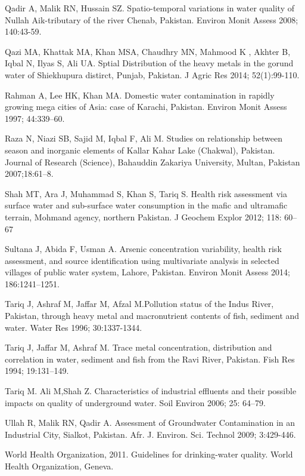\begin{thebibliography}
\bibitem{} \hangindent=1cm Qadir A, Malik RN, Hussain SZ. Spatio-temporal variations in water quality of Nullah Aik-tributary of the river Chenab, Pakistan. Environ Monit Assess 2008; 140:43-59.

\bibitem{} \hangindent=1cm Qazi MA, Khattak MA, Khan MSA, Chaudhry MN, Mahmood K , Akhter B, Iqbal N, Ilyas S, Ali UA. Sptial Distribution of the heavy metals in the gorund water of Shiekhupura distirct, Punjab, Pakistan. J Agric Res 2014; 52(1):99-110.

\bibitem{} \hangindent=1cm Rahman A, Lee HK, Khan MA. Domestic water contamination in rapidly growing mega cities of Asia: case of Karachi, Pakistan. Environ Monit Assess 1997; 44:339–60.

\bibitem{} \hangindent=1cm Raza N, Niazi SB, Sajid M, Iqbal F, Ali M. Studies on relationship between season and inorganic elements of Kallar Kahar Lake (Chakwal), Pakistan. Journal of Research (Science), Bahauddin Zakariya University, Multan, Pakistan 2007;18:61–8.

\bibitem{} \hangindent=1cm Shah MT, Ara J, Muhammad S, Khan S, Tariq S. Health risk assessment via surface water and sub-surface water consumption in the maﬁc and ultramaﬁc terrain, Mohmand agency, northern Pakistan. J Geochem Explor 2012; 118: 60–67

\bibitem{} \hangindent=1cm Sultana J,  Abida F,  Usman A. Arsenic concentration variability, health risk assessment, and source identification using multivariate analysis in selected villages of public water system, Lahore, Pakistan. Environ Monit Assess 2014; 186:1241–1251. 

\bibitem{} \hangindent=1cm Tariq J, Ashraf M, Jaffar M, Afzal M.Pollution status of the Indus River, Pakistan, through heavy metal and macronutrient contents of fish, sediment and water. Water Res 1996; 30:1337-1344.

\bibitem{} \hangindent=1cm Tariq J, Jaffar M, Ashraf M. Trace metal concentration, distribution and correlation in water, sediment and fish from the Ravi River, Pakistan. Fish Res 1994; 19:131–149.

\bibitem{} \hangindent=1cm Tariq M. Ali M,Shah Z. Characteristics of industrial effluents and their possible impacts on quality of underground water. Soil Environ 2006; 25: 64–79.

\bibitem{} \hangindent=1cm Ullah R,  Malik RN, Qadir A. Assessment of Groundwater Contamination in an Industrial City, Sialkot, Pakistan. Afr. J. Environ. Sci. Technol 2009; 3:429-446.

\bibitem{} \hangindent=1cm World Health Organization, 2011. Guidelines for drinking-water quality. World Health Organization, Geneva.


\end{thebibliography}

\endgroup